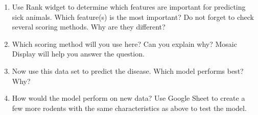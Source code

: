 \begin{enumerate}
    \item Use Rank widget to determine which features are important for predicting sick animals. Which feature(s) is the most important? Do not forget to check several scoring methods. Why are they different?
    \item Which scoring method will you use here? Can you explain why? Mosaic Display will help you answer the question.
    \item Now use this data set to predict the disease. Which model performs best? Why?
    \item How would the model perform on new data? Use Google Sheet to create a few more rodents with the same characteristics as above to test the model.
\end{enumerate}
